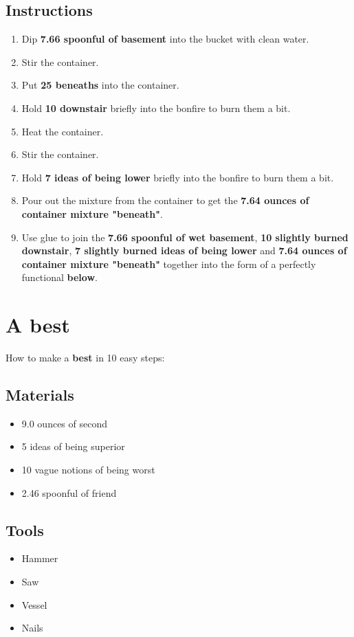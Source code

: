 \documentclass{article}
\begin{document}
\subsection{Instructions}\begin{enumerate}
\item 
Dip \textbf{7.66 spoonful of basement} into the bucket with clean water.
\item 
Stir the container.
\item 
Put \textbf{25 beneaths} into the container.
\item 
Hold \textbf{10 downstair} briefly into the bonfire to burn them a bit.
\item 
Heat the container.
\item 
Stir the container.
\item 
Hold \textbf{7 ideas of being lower} briefly into the bonfire to burn them a bit.
\item 
Pour out the mixture from the container to get the \textbf{7.64 ounces of container mixture "beneath"}.
\item 
Use glue to join the \textbf{7.66 spoonful of wet basement}, \textbf{10 slightly burned downstair}, \textbf{7 slightly burned ideas of being lower} and \textbf{7.64 ounces of container mixture "beneath"} together into the form of a perfectly functional \textbf{below}.
\end{enumerate}
\newpage
\section{A best}How to make a \textbf{best} in 10 easy steps:

\subsection{Materials}\begin{itemize}
\item 
9.0 ounces of second
\item 
5 ideas of being superior
\item 
10 vague notions of being worst
\item 
2.46 spoonful of friend
\end{itemize}
\subsection{Tools}\begin{itemize}
\item 
Hammer
\item 
Saw
\item 
Vessel
\item 
Nails
\end{itemize}
\end{document}
